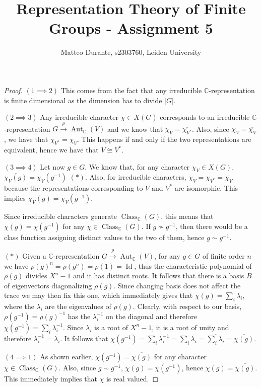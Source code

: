 \documentclass{article}
\newcommand{\numberset}{\mathbb}
\newcommand{\C}{\numberset{C}}
\newcommand{\exercise}[1]{\noindent {\bf Exercise #1}}
\DeclareMathOperator{\Id}{Id}
\DeclareMathOperator{\Aut}{Aut}
\DeclareMathOperator{\Class}{Class}
\begin{document}
\title{Representation Theory of Finite Groups - Assignment 5}

\author{Matteo Durante, s2303760, Leiden University}

\maketitle

\exercise{9.1}

\begin{proof}
    $(1\implies 2)$ This comes from the fact that any irreducible
    $\C$-representation is finite dimensional as the dimension has to divide
    $|G|$.

    $(2\implies 3)$ Any irreducible character $\chi\in X(G)$ corresponds to an
    irreducible $\C$-representation $G\xrightarrow{\rho}\Aut_\C(V)$ and we know
    that $\chi_V=\overline{\chi_{V^*}}$. Also, since $\chi_V=\overline{\chi_V}$,
    we have that $\chi_{V^*}=\chi_V$. This happens if and only if the two
    representations are equivalent, hence we have that $V\cong V^*$.

    $(3\implies 4)$ Let now $g\in G$. We know that, for any character
    $\chi_V\in X(G)$, $\overline{\chi_V(g)}=\chi_V(g^{-1})$ $(*)$. Also, for
    irreducible characters, $\chi_V=\chi_{V^*}=\overline{\chi_V}$ because the
    representations corresponding to $V$ and $V^*$ are isomorphic. This implies
    $\chi_V(g)=\chi_V(g^{-1})$.
    
    Since irreducible characters generate $\Class_\C(G)$, this means that
    $\chi(g)=\chi(g^{-1})$ for any $\chi\in\Class_\C(G)$. If $g\not\sim g^{-1}$,
    then there would be a class function assigning distinct values to the two of
    them, hence $g\sim g^{-1}$.

    $(*)$ Given a $\C$-representation $G\xrightarrow{\rho}\Aut_\C(V)$, for any
    $g\in G$ of finite order $n$ we have $\rho(g)^n=\rho(g^n)=\rho(1)=\Id$, thus
    the characteristic polynomial of $\rho(g)$ divides $X^n-1$ and it has
    distinct roots. It follows that there is a basis $B$ of eigenvectors
    diagonalizing $\rho(g)$. Since changing basis does not affect the trace
    we may then fix this one, which immediately gives that
    $\chi(g)=\sum_i\lambda_i$, where the $\lambda_i$ are the eigenvalues of
    $\rho(g)$. Clearly, with respect to our basis, $\rho(g^{-1})=\rho(g)^{-1}$
    has the $\lambda_i^{-1}$ on the diagonal and therefore
    $\chi(g^{-1})=\sum_i\lambda_i^{-1}$. Since $\lambda_i$ is a root of $X^n-1$,
    it is a root of unity and therefore $\lambda_i^{-1}=\overline{\lambda_i}$.
    It follows that $\chi(g^{-1})=\sum_i\lambda_i^{-1}=
    \sum_i\overline{\lambda_i}=\overline{\sum_i\lambda_i}=\overline{\chi(g)}$.

    $(4\implies 1)$ As shown earlier, $\chi(g^{-1})=\overline{\chi(g)}$
    for any character $\chi\in\Class_\C(G)$. Also, since $g\sim g^{-1}$,
    $\chi(g)=\chi(g^{-1})$, hence $\chi(g)=\overline{\chi(g)}$. This immediately
    implies that $\chi$ is real valued.
\end{proof}
\end{document}
